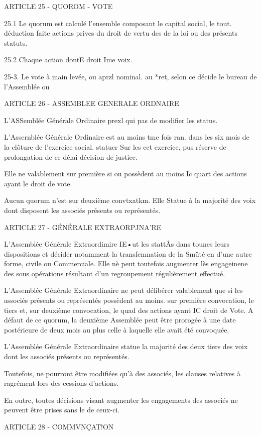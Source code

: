 \documentclass{article}
\begin{document}
ARTICLE 25 - QUOROM - VOTE

25.1 Le quorum est calculé l'ensemble composant le capital social, le tout.  déduction faite actions prives du droit de vertu des de la loi ou des présents statuts.

25.2 Chaque action dontE droit Ime voix.

25-3. Le vote à main levée, ou aprzl nominal. au *ret, selon ce décide le bureau de l'Assemblée ou

ARTICLE 26 - ASSEMBLEE GENERALE ORDNAIRE

L'ASSemblée Générale Ordinaire prexl qui pas de modifier les status.

L'Assernblée Générale Ordinaire est au moins tme fois ran. dans les six mois de la clôture de l'exercice social. statuer Sur les cet exercice, pus réserve de prolongation de ce délai décision de justice.

Elle ne valablement sur première si ou possèdent au moins Ic quart des actions ayant le droit de vote.

Aucun quorum n'est sur deuxième convtxatkm. Elle Statue à la majorité des voix dont disposent les associés présents ou représentés.

ARTICLE 27 - GÉNÉRALE EXTRAORPJNA'RE

L'Assemblée Générale Extraordimire IE•ut les stattÂs dans tounes leurs dispositions ct décider notamment la transfcmnation de la Smüté en d'une autre forme, civile ou Commerciale. Elle nè peut toutefois augmenter lès engageinene des sous opérations résultant d'un regroupement régulièrement effectué.

L'Assembléc Générale Extraordinaire ne peut délibérer valablement que si les associés présents ou représentés possèdent au moins. sur première convocation, le tiers et, sur deuxième convocation, le quad des actions ayant IC droit de Vote. A défaut de ce quorum, la deuxième Assemblée peut être prorogée à une date postérieure de deux mois au plus celle à laquelle elle avait été convoquée.

L'Assemblée Générale Extraordinaire statue la majorité des deux tiers des voix dont les associés présents ou représentés.

Toutefois, ne pourront être modifiées qu'à des associés, les clauses relatives à ragrément lors des cessions d'actions.

En outre, toutes décisions visant augmenter les engagements des associés ne peuvent être prises sans le de ceux-ci.

ARTICLE 28 - COMMVNÇAT!ON
\end{document}

